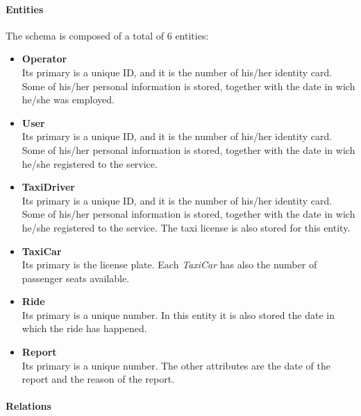 \paragraph{Entities} %
\label{par:entities}
The schema is composed of a total of 6 entities:

\begin{itemize}
	\item {\textbf{Operator}} \\
		Its primary is a unique ID, and it is the number of his/her identity card.
		Some of his/her personal information is stored, together with the date in wich he/she was employed.
	\item {\textbf{User}} \\
		Its primary is a unique ID, and it is the number of his/her identity card.
		Some of his/her personal information is stored, together with the date in wich he/she registered to the service.
	\item {\textbf{TaxiDriver}} \\
		Its primary is a unique ID, and it is the number of his/her identity card.
		Some of his/her personal information is stored, together with the date in wich he/she registered to the service.
		The taxi license is also stored for this entity.
	\item {\textbf{TaxiCar}} \\
		Its primary is the license plate. Each \emph{TaxiCar} has also the number of passenger seats available.
	\item {\textbf{Ride}} \\
		Its primary is a unique number. In this entity it is also stored the date in which the ride has happened.
	\item {\textbf{Report}} \\
		Its primary is a unique number. The other attributes are the date of the report and the reason of the report.
\end{itemize}



\paragraph{Relations} %
\label{par:relations}



